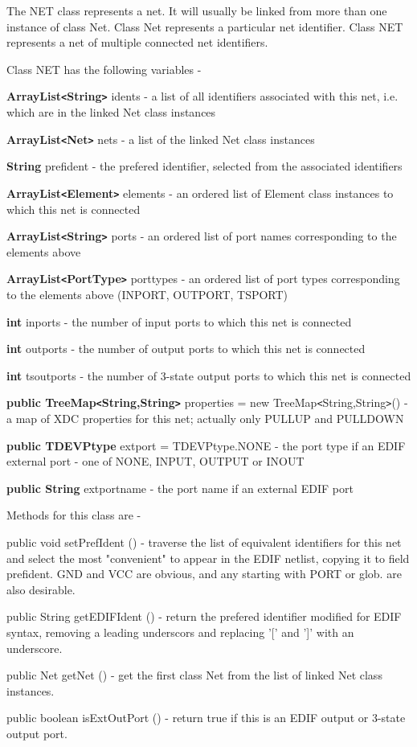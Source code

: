 The NET class represents a net. It will usually be linked from more than one
instance of class Net. Class Net represents a particular net identifier.
Class NET represents a net of multiple connected net identifiers.

Class NET has the following variables -

\blist
\item   {\bf ArrayList\verb'<'String\verb'>'} idents - a list of all identifiers associated
        with this net, i.e. which are in the linked Net class instances
\item   {\bf ArrayList\verb'<'Net\verb'>'} nets - a list of the linked Net class instances
\item   {\bf String} prefident - the prefered identifier, selected from the
        associated identifiers
\item   {\bf ArrayList\verb'<'Element\verb'>'} elements - an ordered list of Element class
        instances to which this net is connected
\item   {\bf ArrayList\verb'<'String\verb'>'} ports - an ordered list of port names corresponding
        to the elements above
\item   {\bf ArrayList\verb'<'PortType\verb'>'} porttypes - an ordered list of port types
        corresponding to the elements above (INPORT, OUTPORT, TSPORT)
\item   {\bf int} inports - the number of input ports to which this net is connected
\item   {\bf int} outports - the number of output ports to which this net is connected
\item   {\bf int} tsoutports - the number of 3-state output ports to which this net is connected
\item   {\bf public  TreeMap\verb'<'String,String\verb'>'} properties = new TreeMap\verb'<'String,String\verb'>'() -
        a map of XDC properties for this net; actually only PULLUP and PULLDOWN
\item   {\bf public  TDEVPtype} extport = TDEVPtype.NONE - the port type if
        an EDIF external port - one of NONE, INPUT, OUTPUT or INOUT
\item   {\bf public  String} extportname - the port name if an external EDIF port
\blend

Methods for this class are -

public void setPrefIdent () - traverse the list of equivalent identifiers for this net
and select the most "convenient" to appear in the EDIF netlist, copying it to
field prefident. GND and VCC are obvious, and any starting with PORT or glob. are
also desirable.

public String getEDIFIdent () - return the prefered identifier modified for
EDIF syntax, removing a leading underscors and replacing '[' and ']' with an
underscore.

public Net getNet () - get the first class Net from the list of linked Net class
instances.

public boolean isExtOutPort () - return true if this is an EDIF output or 3-state
output port.
